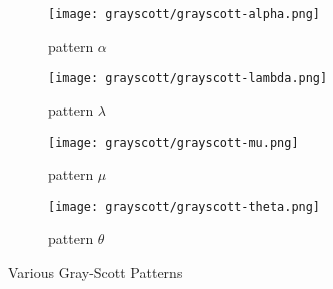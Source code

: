 \begin{figure}[tbh]
\begin{center}
	\begin{subfigure}[tbh]{0.475\textwidth}
	\begin{center}
	\texttt{[image: grayscott/grayscott-alpha.png]}
	\caption{ pattern $\alpha$ }
	\end{center}
	\end{subfigure}
\hfill
	\begin{subfigure}[tbh]{0.475\textwidth}
	\begin{center}
	\texttt{[image: grayscott/grayscott-lambda.png]}
	\caption{ pattern $\lambda$ }
	\end{center}
	\end{subfigure}
\hfill
	\begin{subfigure}[tbh]{0.475\textwidth}
	\begin{center}
	\texttt{[image: grayscott/grayscott-mu.png]}
	\caption{ pattern $\mu$ }
	\end{center}
	\end{subfigure}
\hfill
	\begin{subfigure}[tbh]{0.475\textwidth}
	\begin{center}
	\texttt{[image: grayscott/grayscott-theta.png]}
	\caption{ pattern $\theta$ }
	\end{center}
	\end{subfigure}
\hfill

\end{center}
\caption{Various Gray-Scott Patterns \label{grayscott-produced} }
\end{figure}